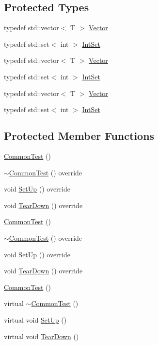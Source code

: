 \subsection*{Protected Types}
\begin{DoxyCompactItemize}
\item 
typedef std\+::vector$<$ T $>$ \mbox{\hyperlink{class_common_test_a6dfdcede6964887b9f4254a0e0478e37}{Vector}}
\item 
typedef std\+::set$<$ int $>$ \mbox{\hyperlink{class_common_test_a62827e9d3064cddf4a8698747f1bd434}{Int\+Set}}
\item 
typedef std\+::vector$<$ T $>$ \mbox{\hyperlink{class_common_test_a6dfdcede6964887b9f4254a0e0478e37}{Vector}}
\item 
typedef std\+::set$<$ int $>$ \mbox{\hyperlink{class_common_test_a62827e9d3064cddf4a8698747f1bd434}{Int\+Set}}
\item 
typedef std\+::vector$<$ T $>$ \mbox{\hyperlink{class_common_test_a6dfdcede6964887b9f4254a0e0478e37}{Vector}}
\item 
typedef std\+::set$<$ int $>$ \mbox{\hyperlink{class_common_test_a62827e9d3064cddf4a8698747f1bd434}{Int\+Set}}
\end{DoxyCompactItemize}
\subsection*{Protected Member Functions}
\begin{DoxyCompactItemize}
\item 
\mbox{\hyperlink{class_common_test_abd5ec205d90f4b81efab2a6f972f3db0}{Common\+Test}} ()
\item 
\mbox{\hyperlink{class_common_test_af98e7c54aa3fbfb8e8b9fdbc040ec6b5}{$\sim$\+Common\+Test}} () override
\item 
void \mbox{\hyperlink{class_common_test_a4d98ceceb09fb614ff53e59e0695ea91}{Set\+Up}} () override
\item 
void \mbox{\hyperlink{class_common_test_a5e851b64ff1f73cb79b4dbd1d39fd075}{Tear\+Down}} () override
\item 
\mbox{\hyperlink{class_common_test_abd5ec205d90f4b81efab2a6f972f3db0}{Common\+Test}} ()
\item 
\mbox{\hyperlink{class_common_test_af98e7c54aa3fbfb8e8b9fdbc040ec6b5}{$\sim$\+Common\+Test}} () override
\item 
void \mbox{\hyperlink{class_common_test_a4d98ceceb09fb614ff53e59e0695ea91}{Set\+Up}} () override
\item 
void \mbox{\hyperlink{class_common_test_a5e851b64ff1f73cb79b4dbd1d39fd075}{Tear\+Down}} () override
\item 
\mbox{\hyperlink{class_common_test_abd5ec205d90f4b81efab2a6f972f3db0}{Common\+Test}} ()
\item 
virtual \mbox{\hyperlink{class_common_test_a675a632fcf7b1fd961fefc619d6a458d}{$\sim$\+Common\+Test}} ()
\item 
virtual void \mbox{\hyperlink{class_common_test_a4c7bf7889ce48a9d06530bc4a437f3f5}{Set\+Up}} ()
\item 
virtual void \mbox{\hyperlink{class_common_test_aeae195c2cefa956c6ae5be1226e6ecd8}{Tear\+Down}} ()
\end{DoxyCompactItemize}
